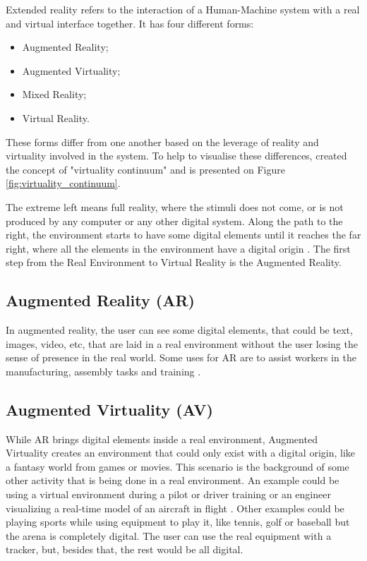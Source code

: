 Extended reality refers to the interaction of a Human-Machine system with a real and virtual interface together. It has four different forms:
\begin{itemize}
    \item Augmented Reality;
    \item Augmented Virtuality;
    \item Mixed Reality;
    \item Virtual Reality.
\end{itemize}

These forms differ from one another based on the leverage of reality and virtuality involved in the system. To help to visualise these differences,  created the concept of "virtuality continuum" and is presented on Figure \ref{fig:virtuality_continuum}. 



The extreme left means full reality, where the stimuli does not come, or is not produced by any computer or any other digital system. Along the path to the right, the environment starts to have some digital elements until it reaches the far right, where all the elements in the environment have a digital origin \cite{nijholt2005virtuality, doolani2020review}. The first step from the Real Environment to Virtual Reality is the Augmented Reality.

\subsection{Augmented Reality (AR)}
\label{subsec:augmented_reality}

    In augmented reality, the user can see some digital elements, that could be text, images, video, etc, that are laid in a real environment without the user losing the sense of presence in the real world. Some uses for AR are to assist workers in the manufacturing, assembly tasks and training \cite{doolani2020review, farrell2018learning, ma2007virtuality}.

\subsection{Augmented Virtuality (AV)}
\label{subsec:augmented_virtuality}
    
    While AR brings digital elements inside a real environment, Augmented Virtuality creates an environment that could only exist with a digital origin, like a fantasy world from games or movies. This scenario is the background of some other activity that is being done in a real environment. An example could be using a virtual environment during a pilot or driver training or an engineer visualizing a real-time model of an aircraft in flight \cite{farshid2018go}. Other examples could be playing sports while using equipment to play it, like tennis, golf or baseball but the arena is completely digital. The user can use the real equipment with a tracker, but, besides that, the rest would be all digital.

